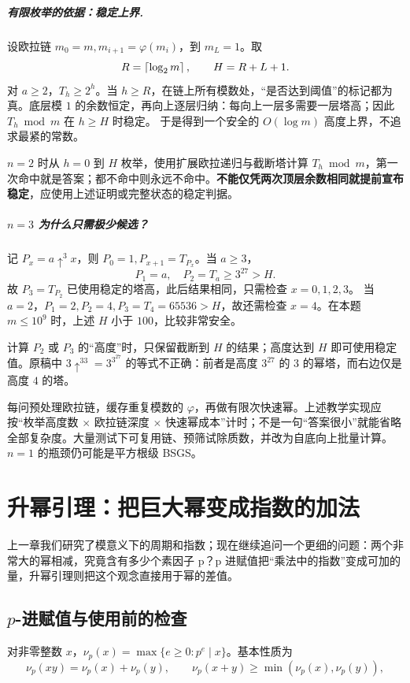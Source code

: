 \paragraph{有限枚举的依据：稳定上界.}
设欧拉链 $m_0=m,m_{i+1}=\varphi(m_i)$，到 $m_L=1$。取
\[
 R=\left\lceil \log_2 m\right\rceil,\qquad H=R+L+1.
\]
对 $a\ge2$，$T_h\ge2^h$。当 $h\ge R$，在链上所有模数处，“是否达到阈值”的标记都为真。底层模 $1$ 的余数恒定，再向上逐层归纳：每向上一层多需要一层塔高；因此 $T_h\bmod m$ 在 $h\ge H$ 时稳定。
于是得到一个安全的 $O(\log m)$ 高度上界，不追求最紧的常数。

$n=2$ 时从 $h=0$ 到 $H$ 枚举，使用扩展欧拉递归与截断塔计算 $T_h\bmod m$，第一次命中就是答案；都不命中则永远不命中。\textbf{不能仅凭两次顶层余数相同就提前宣布稳定}，应使用上述证明或完整状态的稳定判据。

\paragraph{$n=3$ 为什么只需极少候选？}
记 $P_x=a\uparrow^3x$，则 $P_0=1,P_{x+1}=T_{P_x}$。当 $a\ge3$，
\[
 P_1=a,\quad P_2=T_a\ge3^{27}>H.
\]
故 $P_3=T_{P_2}$ 已使用稳定的塔高，此后结果相同，只需检查 $x=0,1,2,3$。
当 $a=2$，$P_1=2,P_2=4,P_3=T_4=65536>H$，故还需检查 $x=4$。在本题 $m\le10^9$ 时，上述 $H$ 小于 $100$，比较非常安全。

计算 $P_2$ 或 $P_3$ 的“高度”时，只保留截断到 $H$ 的结果；高度达到 $H$ 即可使用稳定值。原稿中 $3\uparrow^33=3^{3^{27}}$ 的等式不正确：前者是高度 $3^{27}$ 的 $3$ 的幂塔，而右边仅是高度 $4$ 的塔。

\cost 每问预处理欧拉链，缓存重复模数的 $\varphi$，再做有限次快速幂。上述教学实现应按“枚举高度数 $\times$ 欧拉链深度 $\times$ 快速幂成本”计时；不是一句“答案很小”就能省略全部复杂度。大量测试下可复用链、预筛试除质数，并改为自底向上批量计算。$n=1$ 的瓶颈仍可能是平方根级 BSGS。



\chapter{升幂引理：把巨大幂变成指数的加法}
\begin{chapterintro}[章节导读]
上一章我们研究了模意义下的周期和指数；现在继续追问一个更细的问题：两个非常大的幂相减，究竟含有多少个素因子 p？p 进赋值把“乘法中的指数”变成可加的量，升幂引理则把这个观念直接用于幂的差值。
\end{chapterintro}

\section{\texorpdfstring{$p$}{p}-进赋值与使用前的检查}
对非零整数 $x$，$\nu_p(x)=\max\{e\ge0:p^e\mid x\}$。基本性质为
\[
 \nu_p(xy)=\nu_p(x)+\nu_p(y),\qquad
 \nu_p(x+y)\ge\min(\nu_p(x),\nu_p(y)),
\]

